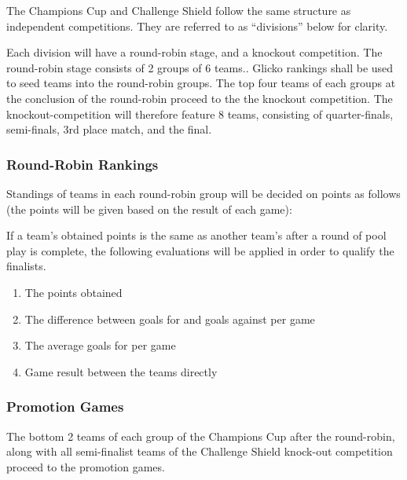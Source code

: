 The Champions Cup and Challenge Shield follow the same structure as independent competitions. They are referred to as ``divisions'' below for clarity.

Each division will have a round-robin stage, and a knockout competition. The round-robin stage consists of 2 groups of 6 teams.. Glicko rankings shall be used to seed teams into the round-robin groups. The top four teams of each groups at the conclusion of the round-robin proceed to the the knockout competition.  The knockout-competition will therefore feature 8 teams, consisting of quarter-finals, semi-finals, 3rd place match, and the final.

\subsubsection{Round-Robin Rankings}
\label{sec:round-robin-rankings}

Standings of teams in each round-robin group will be decided on points as follows (the points will be given based on the result of each game):


If a team's obtained points is the same as another team's after a round of pool play is complete, the following evaluations will be applied in order to qualify the finalists.
\begin{enumerate}

\item The points obtained

\item The difference between goals for and goals against per game

\item The average goals for per game

\item Game result between the teams directly

\end{enumerate}

\subsubsection{Promotion Games}

The bottom 2 teams of each group of the Champions Cup after the round-robin, along with all semi-finalist teams of the Challenge Shield knock-out competition proceed to the promotion games.


